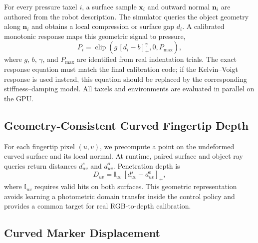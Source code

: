 \documentclass[10pt,twocolumn]{article}
\begin{document}
For every pressure taxel $i$, a surface sample $\mathbf{x}_i$ and outward normal
$\mathbf{n}_i$ are authored from the robot description.  The simulator queries
the object geometry along $\mathbf{n}_i$ and obtains a local compression or
surface gap $d_i$.  A calibrated monotonic response maps this geometric signal
to pressure,
\begin{equation}
    P_i = \operatorname{clip}
    \left(g\,[d_i-b]_+^{\gamma},0,P_{\max}\right),
\end{equation}
where $g$, $b$, $\gamma$, and $P_{\max}$ are identified from real indentation
trials.  The exact response equation must match the final calibration code; if
the Kelvin--Voigt response is used instead, this equation should be replaced by
the corresponding stiffness--damping model.  All taxels and environments are
evaluated in parallel on the GPU.

\subsection{Geometry-Consistent Curved Fingertip Depth}

For each fingertip pixel $(u,v)$, we precompute a point on the undeformed curved
surface and its local normal.  At runtime, paired surface and object ray queries
return distances $d^{s}_{uv}$ and $d^{o}_{uv}$.  Penetration depth is
\begin{equation}
    D_{uv} =
    \mathbb{I}_{uv}\,[d^{s}_{uv}-d^{o}_{uv}]_+,
\end{equation}
where $\mathbb{I}_{uv}$ requires valid hits on both surfaces.  This geometric
representation avoids learning a photometric domain transfer inside the
control policy and provides a common target for real RGB-to-depth calibration.

\subsection{Curved Marker Displacement}
\end{document}
